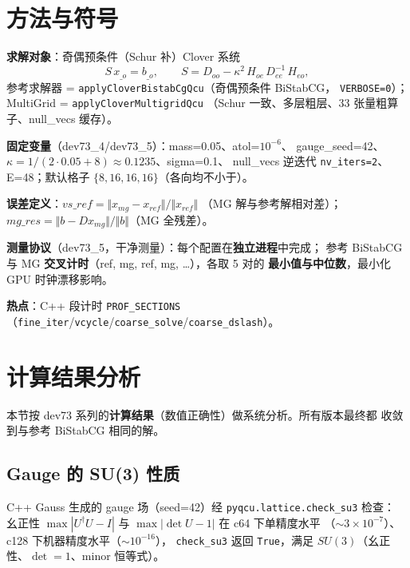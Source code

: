 \documentclass[11pt,a4paper]{article}
\begin{document}
\section{方法与符号}
\label{sec:method}

\textbf{求解对象}：奇偶预条件（Schur 补）Clover 系统
\begin{equation}
  S\,x_{\_o}=b_{\_o},\qquad
  S=D_{oo}-\kappa^2\,H_{oe}\,D_{ee}^{-1}\,H_{eo},
\end{equation}
参考求解器 = \texttt{applyCloverBistabCgQcu}（奇偶预条件 BiStabCG，
\texttt{VERBOSE=0}）；MultiGrid = \texttt{applyCloverMultigridQcu}
（Schur 一致、多层粗层、33 张量粗算子、null\_vecs 缓存）。

\textbf{固定变量}（dev73\_4/dev73\_5）：mass=0.05、atol=$10^{-6}$、
gauge\_seed=42、$\kappa=1/(2\cdot0.05+8)\approx0.1235$、sigma=0.1、
null\_vecs 逆迭代 \texttt{nv\_iters=2}、E=48；默认格子 $\{8,16,16,16\}$（各向均不小于）。

\textbf{误差定义}：$vs\_ref=\Vert x_{mg}-x_{ref}\Vert/\Vert x_{ref}\Vert$
（MG 解与参考解相对差）；$mg\_res=\Vert b-D x_{mg}\Vert/\Vert b\Vert$（MG 全残差）。

\textbf{测量协议}（dev73\_5，干净测量）：每个配置在\textbf{独立进程}中完成；
参考 BiStabCG 与 MG \textbf{交叉计时}（ref, mg, ref, mg, \dots），各取 5 对的
\textbf{最小值与中位数}，最小化 GPU 时钟漂移影响。

\textbf{热点}：C++ 段计时 \texttt{PROF\_SECTIONS}
（\texttt{fine\_iter}/\texttt{vcycle}/\texttt{coarse\_solve}/\texttt{coarse\_dslash}）。

\section{计算结果分析}
\label{sec:result-analysis}

本节按 dev73 系列的\textbf{计算结果}（数值正确性）做系统分析。所有版本最终都
收敛到与参考 BiStabCG 相同的解。

\subsection{Gauge 的 SU(3) 性质}
\label{sec:gauge}

C++ Gauss 生成的 gauge 场（seed=42）经 \texttt{pyqcu.lattice.check\_su3} 检查：
幺正性 $\max|U^\dagger U-I|$ 与 $\max|\det U-1|$ 在 c64 下单精度水平
（$\sim3\times10^{-7}$）、c128 下机器精度水平（$\sim10^{-16}$），
\texttt{check\_su3} 返回 \texttt{True}，满足 $SU(3)$（幺正性、$\det=1$、minor 恒等式）。

\end{document}

